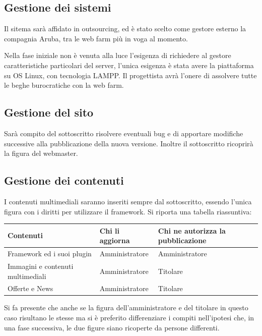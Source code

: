 \documentclass[a4paper,12pt,hidelinks]{report}
\begin{document}
  \subsection{Gestione dei sistemi}
    Il sitema sarà affidato in outsourcing, ed è stato scelto come gestore esterno la compagnia Aruba, tra le web farm più in voga al momento.
    \par Nella fase iniziale non è venuta alla luce l'esigenza di richiedere al gestore caratteristiche particolari del server, l'unica esigenza 
    è stata avere la piattaforma su OS Linux, con tecnologia LAMPP.
    Il progettista avrà l'onere di assolvere tutte le beghe burocratiche con la web farm.
    
  \subsection{Gestione del sito}
    Sarà compito del sottoscritto risolvere eventuali bug e di apportare modifiche successive alla pubblicazione della nuova versione. Inoltre il sottoscritto ricoprirà
    la figura del webmaster.
    
  \subsection{Gestione dei contenuti}
    I contenuti multimediali saranno inseriti sempre dal sottoscritto, essendo l'unica figura con i diritti per utilizzare il framework.
    Si riporta una tabella riassuntiva:
    \begin{center}
      \begin{tabular}{||m{6cm}|m{3cm}|m{3cm}||}
	\hline
	  \textbf{Contenuti} & \textbf{Chi li aggiorna} & \textbf{Chi ne autorizza la pubblicazione}\\
	\hline
	  Framework ed i suoi plugin & Amministratore & Amministratore\\
	\hline
	  Immagini e contenuti multimediali & Amministratore & Titolare\\
	\hline  
	  Offerte e News & Amministratore & Titolare \\
	\hline
      \end{tabular}
    \end{center}
    \par Si fa presente che anche se la figura dell'amministratore e del titolare in questo caso risultano le stesse ma si è preferito differenziare i compiti nell'ipotesi
    che, in una fase successiva, le due figure siano ricoperte da persone differenti.
  
\end{document}
